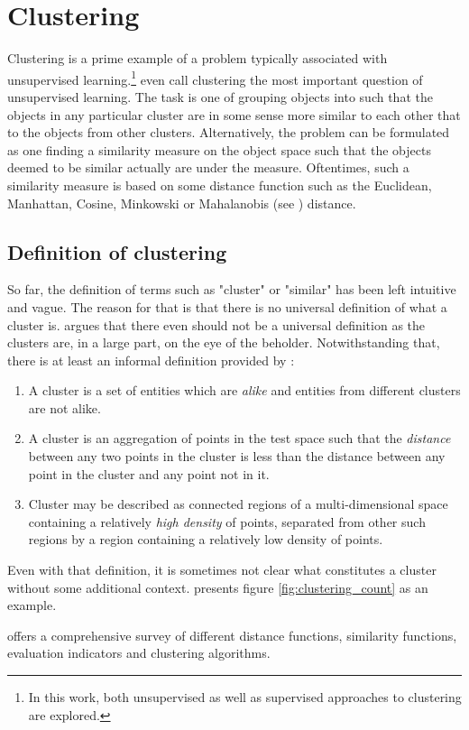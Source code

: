\chapter{Clustering}

Clustering is a prime example of a problem typically associated with unsupervised learning.\footnote{In this work, both unsupervised as well as supervised approaches to clustering are explored.} \cite{xu_comprehensive_2015} even call clustering the most important question of unsupervised learning. The task is one of grouping objects into  such that the objects in any particular cluster are in some sense more similar to each other that to the objects from other clusters. Alternatively, the problem can be formulated as one finding a similarity measure on the object space such that the objects deemed to be similar actually are under the measure. Oftentimes, such a similarity measure is based on some distance function such as the Euclidean, Manhattan, Cosine, Minkowski or Mahalanobis (see \cite{mahalanobis_generalised_1936}) distance.

\section{Definition of clustering}
So far, the definition of terms such as "cluster" or "similar" has been left intuitive and vague. The reason for that is that there is no universal definition of what a cluster is. \cite{estivill-castro_why_2002} argues that there even should not be a universal definition as the clusters are, in a large part, on the eye of the beholder. Notwithstanding that, there is at least an informal definition provided by \cite{jain_algorithms_1988}:

\begin{enumerate}
	\item A cluster is a set of entities which are \textit{alike} and entities from different clusters are not alike.
	\item A cluster is an aggregation of points in the test space such that the \textit{distance} between any two points in the cluster is less than the distance between any point in the cluster and any point not in it.
	\item Cluster may be described as connected regions of a multi-dimensional space containing a relatively \textit{high density} of points, separated from other such regions by a region containing a relatively low density of points.
\end{enumerate}

Even with that definition, it is sometimes not clear what constitutes a cluster without some additional context. \cite{jain_algorithms_1988} presents figure \ref{fig:clustering_count}  as an example.

\cite{xu_comprehensive_2015} offers a comprehensive survey of different distance functions, similarity functions, evaluation indicators and clustering algorithms.
